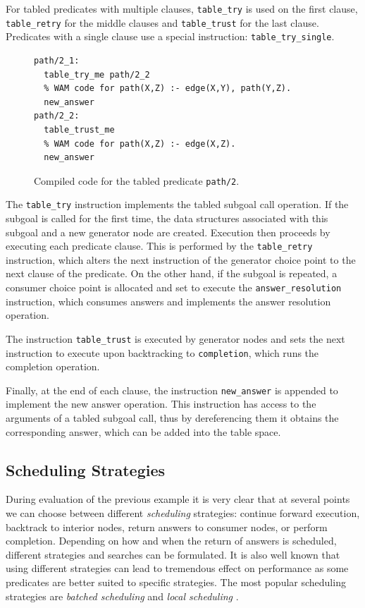 For tabled predicates with multiple clauses, \texttt{table\_try} is used on the first clause,
\texttt{table\_retry} for the middle clauses and \texttt{table\_trust} for the last clause.
Predicates with a single clause use a special instruction: \texttt{table\_try\_single}.

\begin{figure}[ht]
\begin{Verbatim}
path/2_1:
  table_try_me path/2_2
  % WAM code for path(X,Z) :- edge(X,Y), path(Y,Z).
  new_answer
path/2_2:
  table_trust_me
  % WAM code for path(X,Z) :- edge(X,Z).
  new_answer
\end{Verbatim}
\caption{Compiled code for the tabled predicate \texttt{path/2}.}
\label{fig:compiled_tabled_path}
\end{figure}

The \texttt{table\_try} instruction implements the tabled subgoal call operation. If the subgoal is called
for the first time, the data structures associated with this subgoal and a new generator node are created.
Execution then proceeds by executing each predicate clause. This is performed by the \texttt{table\_retry}
instruction, which alters the next instruction of the generator choice point to the next clause of the predicate.
On the other hand, if the subgoal is repeated, a consumer choice point is allocated and set to execute the
\texttt{answer\_resolution} instruction, which consumes answers and implements the answer resolution operation.

The instruction \texttt{table\_trust} is executed by generator nodes and sets the next
instruction to execute upon backtracking to
\texttt{completion}, which runs the completion operation.

Finally, at the end of each clause, the instruction \texttt{new\_answer} is appended to implement
the new answer operation. This instruction has access to the arguments of a tabled subgoal call,
thus by dereferencing them it obtains the corresponding answer, which can be added into the table space.    

\subsection{Scheduling Strategies}

During evaluation of the previous example it is very clear that at several points we can choose between
different \textit{scheduling} strategies: continue forward execution, backtrack to interior nodes,
return answers to consumer nodes, or perform completion. Depending on how and when the return of answers
is scheduled, different strategies and searches can be formulated. It is also well known that using
different strategies can lead to tremendous effect on performance as some predicates are better suited to specific strategies. 
The most popular scheduling strategies are \textit{batched scheduling} and \textit{local scheduling} \cite{Freire-96}.

